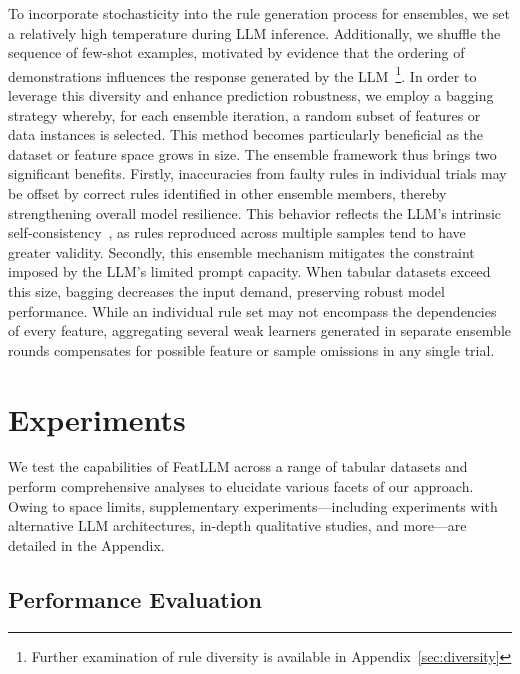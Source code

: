 To incorporate stochasticity into the rule generation process for ensembles, we set a relatively high temperature during LLM inference. Additionally, we shuffle the sequence of few-shot examples, motivated by evidence that the ordering of demonstrations influences the response generated by the LLM~\cite{lu2022fantastically}\footnote{Further examination of rule diversity is available in Appendix~\ref{sec:diversity}}. In order to leverage this diversity and enhance prediction robustness, we employ a bagging strategy whereby, for each ensemble iteration, a random subset of features or data instances is selected. This method becomes particularly beneficial as the dataset or feature space grows in size. The ensemble framework thus brings two significant benefits. Firstly, inaccuracies from faulty rules in individual trials may be offset by correct rules identified in other ensemble members, thereby strengthening overall model resilience. This behavior reflects the LLM’s intrinsic self-consistency~\cite{wang2022self}, as rules reproduced across multiple samples tend to have greater validity. Secondly, this ensemble mechanism mitigates the constraint imposed by the LLM’s limited prompt capacity. When tabular datasets exceed this size, bagging decreases the input demand, preserving robust model performance. While an individual rule set may not encompass the dependencies of every feature, aggregating several weak learners generated in separate ensemble rounds compensates for possible feature or sample omissions in any single trial.

\section{Experiments}
We test the capabilities of \textsf{FeatLLM} across a range of tabular datasets and perform comprehensive analyses to elucidate various facets of our approach. Owing to space limits, supplementary experiments—including experiments with alternative LLM architectures, in-depth qualitative studies, and more—are detailed in the Appendix.

\subsection{Performance Evaluation}
